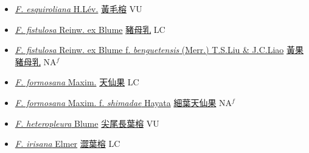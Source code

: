 \begin{itemize}
\begin{itemize}
        \item[] \href{http://www.theplantlist.org/tpl1.1/search?q=Ficus+esquiroliana}{\textit{F. esquiroliana} H.Lév.}   \href{\detokenize{http://taibnet.sinica.edu.tw/chi/taibnet_species_list.php?T2=黃毛榕&T2_new_value=true&fr=y}}{黃毛榕} VU
        \item[] \href{http://www.theplantlist.org/tpl1.1/search?q=Ficus+fistulosa}{\textit{F. fistulosa} Reinw. ex Blume}   \href{\detokenize{http://taibnet.sinica.edu.tw/chi/taibnet_species_list.php?T2=豬母乳&T2_new_value=true&fr=y}}{豬母乳} LC
        \item[] \href{http://www.theplantlist.org/tpl1.1/search?q=Ficus+fistulosa+ f. +benguetensis}{\textit{F. fistulosa} Reinw. ex Blume  f.  \textit{benguetensis} (Merr.) T.S.Liu \& J.C.Liao}   \href{\detokenize{http://taibnet.sinica.edu.tw/chi/taibnet_species_list.php?T2=黃果豬母乳&T2_new_value=true&fr=y}}{黃果豬母乳} NA$^f$
        \item[] \href{http://www.theplantlist.org/tpl1.1/search?q=Ficus+formosana}{\textit{F. formosana} Maxim.}   \href{\detokenize{http://taibnet.sinica.edu.tw/chi/taibnet_species_list.php?T2=天仙果&T2_new_value=true&fr=y}}{天仙果} LC
        \item[] \href{http://www.theplantlist.org/tpl1.1/search?q=Ficus+formosana+ f. +shimadae}{\textit{F. formosana} Maxim.  f.  \textit{shimadae} Hayata}   \href{\detokenize{http://taibnet.sinica.edu.tw/chi/taibnet_species_list.php?T2=細葉天仙果&T2_new_value=true&fr=y}}{細葉天仙果} NA$^f$
        \item[] \href{http://www.theplantlist.org/tpl1.1/search?q=Ficus+heteropleura}{\textit{F. heteropleura} Blume}   \href{\detokenize{http://taibnet.sinica.edu.tw/chi/taibnet_species_list.php?T2=尖尾長葉榕&T2_new_value=true&fr=y}}{尖尾長葉榕} VU
        \item[] \href{http://www.theplantlist.org/tpl1.1/search?q=Ficus+irisana}{\textit{F. irisana} Elmer}   \href{\detokenize{http://taibnet.sinica.edu.tw/chi/taibnet_species_list.php?T2=澀葉榕&T2_new_value=true&fr=y}}{澀葉榕} LC

\end{itemize}
\end{itemize}
